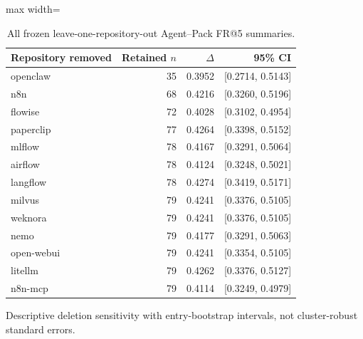 \begin{table}[t]
\centering
\caption{All frozen leave-one-repository-out Agent--Pack FR@5 summaries.}\label{tab:loco}
\small
\begin{adjustbox}{max width=\columnwidth}\begin{tabular}{lrrr}
\toprule
Repository removed & Retained $n$ & $\Delta$ & 95\% CI \\
\midrule
openclaw & 35 & 0.3952 & [0.2714, 0.5143] \\
n8n & 68 & 0.4216 & [0.3260, 0.5196] \\
flowise & 72 & 0.4028 & [0.3102, 0.4954] \\
paperclip & 77 & 0.4264 & [0.3398, 0.5152] \\
mlflow & 78 & 0.4167 & [0.3291, 0.5064] \\
airflow & 78 & 0.4124 & [0.3248, 0.5021] \\
langflow & 78 & 0.4274 & [0.3419, 0.5171] \\
milvus & 79 & 0.4241 & [0.3376, 0.5105] \\
weknora & 79 & 0.4241 & [0.3376, 0.5105] \\
nemo & 79 & 0.4177 & [0.3291, 0.5063] \\
open-webui & 79 & 0.4241 & [0.3354, 0.5105] \\
litellm & 79 & 0.4262 & [0.3376, 0.5127] \\
n8n-mcp & 79 & 0.4114 & [0.3249, 0.4979] \\
\bottomrule
\end{tabular}\end{adjustbox}
\par\vspace{2pt}\begin{minipage}{\columnwidth}\footnotesize Descriptive deletion sensitivity with entry-bootstrap intervals, not cluster-robust standard errors.\end{minipage}
\end{table}
